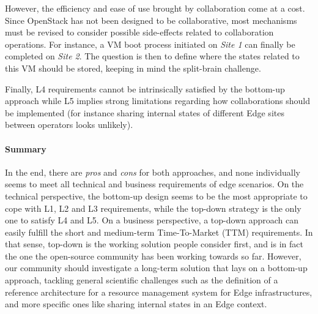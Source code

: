 However, the efficiency and ease of use brought by collaboration come at a
cost. Since OpenStack has not been designed to be collaborative, most
mechanisms must be revised to consider possible side-effects related to
collaboration operations.
%
For instance, a VM boot process initiated on \emph{Site 1} can finally be
completed on \emph{Site 2}. The question is then to define where the states
related to this VM should be stored, keeping in mind the split-brain
challenge.

Finally, L4 requirements cannot be intrinsically satisfied by the
bottom-up approach while L5 implies strong limitations regarding how
collaborations should be implemented (for instance sharing internal
states of different Edge sites between operators looks unlikely).

%



\paragraph{Summary}
In the end, there are \emph{pros} and \emph{cons} for both approaches,
and none individually seems to meet all technical and business
requirements of edge scenarios.
On the technical perspective, the bottom-up
design seems to be the most appropriate to cope with L1, L2 and L3
requirements, while the top-down strategy is the only one to satisfy L4
and L5.
%
On a business perspective, a top-down approach can easily fulfill the
short and medium-term Time-To-Market (TTM) requirements. In that
sense, top-down is the working solution people consider first, and is
in fact the one the open-source community has been working towards so
far. However, our community should investigate a long-term solution
that lays on a bottom-up approach, tackling general scientific
challenges such as the definition of a reference architecture for a
resource management system for Edge infrastructures, and more specific
ones like sharing internal states in an Edge context.







